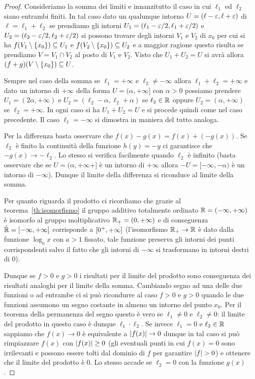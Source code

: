 \begin{proof}
Consideriamo la somma dei limiti
e innanzitutto il caso in cui $\ell_1$ ed $\ell_2$ 
siano entrambi finiti. 
In tal caso
dato un qualunque intorno $U=(\ell-\varepsilon,\ell+\varepsilon)$ 
di $\ell=\ell_1+\ell_2$
se prendiamo gli intorni $U_1=(\ell_1-\varepsilon/2,\ell_1+\varepsilon/2)$ 
e $U_2 = (\ell_2-\varepsilon/2,\ell_2+\varepsilon/2)$ si possono trovare 
degli intorni $V_1$ e $V_2$ di $x_0$ per cui si ha 
$f(V_1\setminus{\left\{ x_0 \right\}}) \subseteq U_1$ e 
$f(V_2\setminus {\left\{ x_0 \right\}}) \subseteq U_2$
e a maggior ragione questo risulta se prendiamo $V=V_1\cap V_2$ 
al posto di $V_1$ e $V_2$. 
Visto che $U_1+U_2 = U$ si avrà allora 
$(f+g)(V\setminus{\left\{ x_0 \right\}})\subseteq U$.

Sempre nel caso della somma 
se $\ell_1=+\infty$ e $\ell_2\neq -\infty$
allora $\ell_1+\ell_2=+\infty$ e 
dato un intorno di $+\infty$ 
della forma $U=(\alpha,+\infty]$ con $\alpha>0$
possiamo prendere 
$U_1 = (2\alpha,+\infty)$ e $U_2 = (\ell_2-\alpha,\ell_2+\alpha)$ 
se $\ell_2\in {\mathbb R}$ oppure $U_2 = (\alpha,+\infty)$ se $\ell_2=+\infty$.
In ogni caso si ha $U_1+U_2 = U$ e si procede quindi come nel caso precedente.
Il caso $\ell_1=-\infty$ si dimostra in maniera del tutto analoga.

Per la differenza basta osservare che $f(x)-g(x) = f(x) + (-g(x))$.
Se $\ell_2$ è finito la continuità della funzione $h(y)=-y$
ci garantisce che $-g(x)\to -\ell_2$.
Lo stesso si verifica facilmente quando $\ell_2$ è infinito 
(basta osservare che se $U=(\alpha,+\infty+]$ è un intorno di $+\infty$
allora $-U = [-\infty,-\alpha)$ è un intorno di $-\infty$). 
Dunque il limite della differenza si riconduce al limite della somma.

Per quanto riguarda il prodotto ci ricordiamo che grazie 
al teorema~\ref{th:isomorfismo} il gruppo additivo totalmente 
ordinato ${\mathbb R} = \left(-\infty,+\infty\right)$ 
è isomorfo al gruppo moltiplicativo ${\mathbb R}_+ = \left(0,+\infty\right)$
e di conseguenza $\bar {{\mathbb R}} = \left[-\infty,+\infty\right]$
corrisponde a $\left[0^+,+\infty\right]$
(l'isomorfismo ${\mathbb R}_+\to {\mathbb R}$ è dato dalla funzione $\log_a x$ con $a>1$ 
fissato,
tale funzione preserva gli intorni dei punti corrispondenti salvo il fatto 
che gli intorni di $-\infty$ si trasformano in intorni destri di $0$).

Dunque se $f > 0$ e $g > 0$ i risultati per il limite del prodotto 
sono conseguenza dei risultati analoghi per il limite della somma.
Cambiando segno ad una delle due funzioni o ad entrambe ci si può 
ricondurre al caso $f > 0$ e $g > 0$ quando le due funzioni assumono 
un segno costante in almeno un intorno del punto $x_0$.
Per il teorema della permanenza del segno questo è vero se 
$\ell_1\neq 0$ e $\ell_2\neq 0$: il limite del prodotto in questo caso 
è dunque $\ell_1\cdot \ell_2$.
Se invece $\ell_1=0$ e $\ell_2\in{\mathbb R}$ sappiamo che $f(x)\to 0$ 
è equivalente a ${\left|f(x)\right|}\to 0$ dunque in tal caso si può rimpiazzare $f(x)$ con ${\left|f(x)\right|}\ge 0$
(gli eventuali punti in cui $f(x)=0$ sono irrilevanti e possono essere tolti 
dal dominio di $f$ per garantire ${\left|f\right|}>0$) e ottenere che il limite 
del prodotto è $0$.
Lo stesso accade se $\ell_2=0$ con la funzione $g(x)$.


\end{proof}
